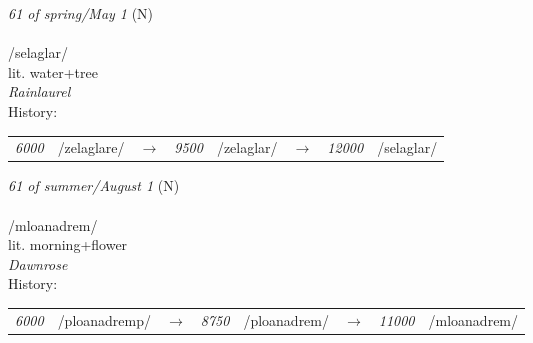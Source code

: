 \vspace{15pt}
\begin{nopagebreak}
 \textit{61 of spring/May 1} (N)\\
\\
\noindent /sel{\textprimstress}aglar/\\
\noindent lit. water+tree\\
\noindent \textit{Rainlaurel}\\


\noindent History:

\vspace{-0pt}
\hspace{40pt}
\begin{tabular}{ccc}
\textit{6000} & /zelaglare/&$\rightarrow$ & \textit{9500} & /zelaglar/&$\rightarrow$ & \textit{12000} & /selaglar/& \\
\end{tabular}

\vspace{20pt}\hline

\end{nopagebreak}
\filbreak



\vspace{15pt}
\begin{nopagebreak}
 \textit{61 of summer/August 1} (N)\\
\\
\noindent /mloan{\textprimstress}adrem/\\
\noindent lit. morning+flower\\
\noindent \textit{Dawnrose}\\


\noindent History:

\vspace{-0pt}
\hspace{40pt}
\begin{tabular}{ccc}
\textit{6000} & /ploanadremp/&$\rightarrow$ & \textit{8750} & /ploanadrem/&$\rightarrow$ & \textit{11000} & /mloanadrem/& \\
\end{tabular}

\vspace{20pt}\hline

\end{nopagebreak}
\filbreak



